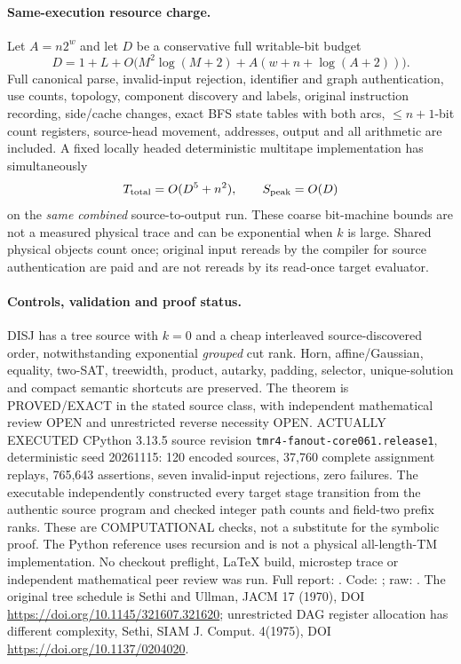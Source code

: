 \documentclass[11pt]{article}
\begin{document}
\paragraph{Same-execution resource charge.}
Let $A=n2^w$ and let $D$ be a conservative full writable-bit budget
\[
D=1+L+O\bigl(M^2\log(M+2)+
 A(w+n+\log(A+2))\bigr).
\]
Full canonical parse, invalid-input rejection, identifier and graph
authentication, use counts, topology, component discovery and labels,
original instruction recording, side/cache changes, exact BFS state
tables with both arcs, $\le n+1$-bit count registers, source-head
movement, addresses, output and all arithmetic are included.
A fixed locally headed deterministic multitape implementation has
simultaneously
\[
T_{\rm total}=O(D^5+n^2),\qquad S_{\rm peak}=O(D)
\]
on the \emph{same combined} source-to-output run. These coarse
bit-machine bounds are not a measured physical trace and can be
exponential when $k$ is large. Shared physical objects count once;
original input rereads by the compiler for source authentication
are paid and are not rereads by its read-once target evaluator.

\paragraph{Controls, validation and proof status.}
DISJ has a tree source with $k=0$ and a cheap interleaved
source-discovered order, notwithstanding exponential \emph{grouped}
cut rank. Horn, affine/Gaussian, equality, two-SAT, treewidth,
product, autarky, padding, selector, unique-solution and compact
semantic shortcuts are preserved. The theorem is PROVED/EXACT
in the stated source class, with independent mathematical review
OPEN and unrestricted reverse necessity OPEN.
ACTUALLY EXECUTED CPython 3.13.5 source revision
\texttt{tmr4-fanout-core061.release1}, deterministic seed 20261115:
120 encoded sources, 37,760 complete assignment replays,
765,643 assertions, seven invalid-input rejections, zero failures.
The executable independently constructed every target stage transition
from the authentic source program and checked integer path counts
and field-two prefix ranks. These are COMPUTATIONAL checks, not
a substitute for the symbolic proof. The Python reference uses
recursion and is not a physical all-length-TM implementation.
No checkout preflight, LaTeX build, microstep trace or independent
mathematical peer review was run. Full report:
.
Code: ;
raw: .
The original tree schedule is Sethi and Ullman, JACM 17 (1970),
DOI \url{https://doi.org/10.1145/321607.321620}; unrestricted
DAG register allocation has different complexity, Sethi,
SIAM J. Comput. 4(1975),
DOI \url{https://doi.org/10.1137/0204020}.
\end{document}
